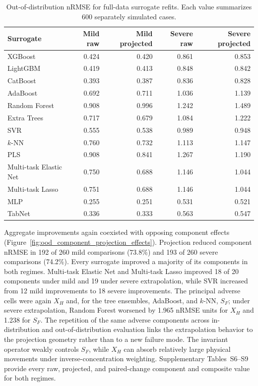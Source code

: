 \documentclass[a4paper,fleqn]{cas-sc}
\begin{document}
\FloatBarrier
\begin{table}[H]
\centering
\caption{Out-of-distribution nRMSE for full-data surrogate refits. Each value summarizes 600 separately simulated cases.}
\label{tab:ood_accuracy}
\scriptsize
\begin{tabular}{lrrrr}
\toprule
Surrogate & Mild raw & Mild projected & Severe raw & Severe projected \\
\midrule
XGBoost & 0.424 & 0.420 & 0.861 & 0.853 \\
LightGBM & 0.419 & 0.413 & 0.848 & 0.842 \\
CatBoost & 0.393 & 0.387 & 0.836 & 0.828 \\
AdaBoost & 0.692 & 0.711 & 1.036 & 1.139 \\
Random Forest & 0.908 & 0.996 & 1.242 & 1.489 \\
Extra Trees & 0.717 & 0.679 & 1.084 & 1.222 \\
SVR & 0.555 & 0.538 & 0.989 & 0.948 \\
$k$-NN & 0.760 & 0.732 & 1.113 & 1.147 \\
PLS & 0.908 & 0.841 & 1.267 & 1.190 \\
Multi-task Elastic Net & 0.750 & 0.688 & 1.146 & 1.044 \\
Multi-task Lasso & 0.751 & 0.688 & 1.146 & 1.044 \\
MLP & 0.255 & 0.251 & 0.531 & 0.521 \\
TabNet & 0.336 & 0.333 & 0.563 & 0.547 \\
\bottomrule
\end{tabular}
\end{table}
\FloatBarrier

Aggregate improvements again coexisted with opposing component effects (Figure~\ref{fig:ood_component_projection_effects}). Projection reduced component nRMSE in 192 of 260 mild comparisons (73.8\%) and 193 of 260 severe comparisons (74.2\%). Every surrogate improved a majority of its components in both regimes. Multi-task Elastic Net and Multi-task Lasso improved 18 of 20 components under mild and 19 under severe extrapolation, while SVR increased from 12 mild improvements to 18 severe improvements. The principal adverse cells were again $X_H$ and, for the tree ensembles, AdaBoost, and $k$-NN, $S_F$; under severe extrapolation, Random Forest worsened by 1.965 nRMSE units for $X_H$ and 1.238 for $S_F$. The repetition of the same adverse components across in-distribution and out-of-distribution evaluation links the extrapolation behavior to the projection geometry rather than to a new failure mode. The invariant operator weakly controls $S_F$, while $X_H$ can absorb relatively large physical movements under inverse-concentration weighting. Supplementary Tables~S6--S9 provide every raw, projected, and paired-change component and composite value for both regimes.
\end{document}
